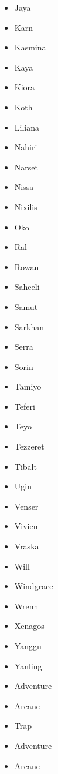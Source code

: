 \documentclass{article}
\begin{document}
\begin{multicols}{3}
\begin{itemize}
        \item Jaya
        \item Karn
        \item Kasmina
        \item Kaya
        \item Kiora
        \item Koth
        \item Liliana
        \item Nahiri
        \item Narset
        \item Nissa
        \item Nixilis
        \item Oko
        \item Ral
        \item Rowan
        \item Saheeli
        \item Samut
        \item Sarkhan
        \item Serra
        \item Sorin
        \item Tamiyo
        \item Teferi
        \item Teyo
        \item Tezzeret
        \item Tibalt
        \item Ugin
        \item Venser
        \item Vivien
        \item Vraska
        \item Will
        \item Windgrace
        \item Wrenn
        \item Xenagos
        \item Yanggu
        \item Yanling
        \item Adventure
        \item Arcane
        \item Trap
        \item Adventure
        \item Arcane
    \end{itemize}
\end{multicols}
\end{document}

